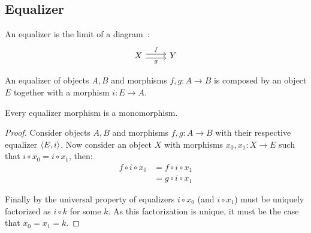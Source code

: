 \subsection{Equalizer}

\begin{definition}[Equalizer]
  An equalizer is the limit of a
  diagram~\parencite[p.~112]{leinster:basic_category_theory}:
  \[\begin{tikzcd}[ampersand replacement=\&]
    X \& Y
    \arrow["f", shift left=1, from=1-1, to=1-2]
    \arrow["g"', shift right=1, from=1-1, to=1-2]
  \end{tikzcd}\]
\end{definition}

\begin{remark}
  An equalizer of objects $A, B$ and morphisms $f, g: A\to B$ is composed by an
  object $E$ together with a morphism $i:E\to A$.
\end{remark}

\begin{theorem}
  Every equalizer morphism is a monomorphism.

  \begin{proof}
    Consider objects $A, B$ and morphisms $f, g: A\to B$ with their respective
    equalizer $\langle E, i\rangle$. Now consider an object $X$ with morphisms $x_0, x_1: X
    \to E$ such that $i\circ x_0 = i\circ x_1$, then:
    \[
      \begin{aligned}
        f \circ i \circ x_0
        &= f \circ i \circ x_1\\
        &= g \circ i \circ x_1
      \end{aligned}
    \]

    Finally by the universal property of equalizers $i\circ x_0$ (and $i\circ
    x_1$) must be uniquely factorized as $i\circ k$ for some $k$. As this
    factorization is unique, it must be the case that $x_0 = x_1 = k$.
  \end{proof}
\end{theorem}